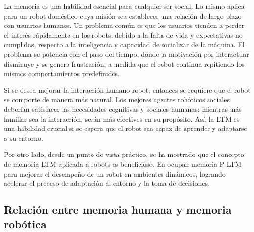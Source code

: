 La memoria es una habilidad esencial para cualquier ser social. Lo mismo aplica para un robot dom\'estico cuya misi\'on sea establecer una relaci\'on de largo plazo con usuarios humanos. Un problema com\'un es que los usuarios tienden a perder el inter\'es r\'apidamente en los robots, debido a la falta de vida y expectativas no cumplidas, respecto a la inteligencia y capacidad de socializar de la m\'aquina. El problema se potencia con el paso del tiempo, donde la motivaci\'on por interactuar disminuye y se genera frustraci\'on, a medida que el robot continua repitiendo los mismos comportamientos predefinidos\cite{Ho2009}.

Si se desea mejorar la interacci\'on humano-robot, entonces se requiere que el robot se comporte de manera m\'as natural. Los mejores agentes rob\'oticos sociales deber\'ian satisfacer las necesidades cognitivas y sociales humanas; mientras m\'as familiar sea la interacci\'on, ser\'an m\'as efectivos en su prop\'osito. As\'i, la LTM es una habilidad crucial si se espera que el robot sea capaz de aprender y adaptarse a su entorno.


Por otro lado, desde un punto de vista pr\'actico, se ha mostrado que el concepto de memoria LTM aplicada a robots es beneficioso. En \cite{Salgado2012} ocupan memoria P-LTM para mejorar el desempe\~no de un robot en ambientes din\'amicos, logrando acelerar el proceso de adaptaci\'on al entorno y la toma de decisiones.



%
%
%
%
%


\subsection{Relaci\'on entre memoria humana y memoria rob\'otica}


